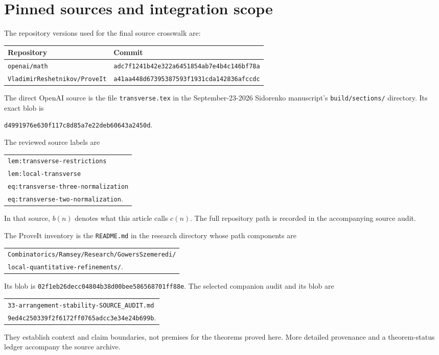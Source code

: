 \documentclass[11pt,a4paper]{article}
\theoremstyle{definition}
\theoremstyle{remark}
\begin{document}
\appendix
\section{Pinned sources and integration scope}
The repository versions used for the final source crosswalk are:
\begin{center}
\begin{tabular}{@{}ll@{}}
\toprule
Repository & Commit\\
\midrule
\texttt{openai/math} & \texttt{adc7f1241b42e322a6451854ab7e4b4c146bf78a}\\
\texttt{VladimirReshetnikov/ProveIt} & \texttt{a41aa448d67395387593f1931cda142836afccdc}\\
\bottomrule
\end{tabular}
\end{center}
The direct OpenAI source is the file \texttt{transverse.tex} in the
September-23-2026 Sidorenko manuscript's \texttt{build/sections/} directory.
Its exact blob is
\begin{center}
\texttt{d4991976e630f117c8d85a7e22deb60643a2450d}.
\end{center}
The reviewed source labels are
\begin{center}
\begin{tabular}{l}
\texttt{lem:transverse-restrictions}\\
\texttt{lem:local-transverse}\\
\texttt{eq:transverse-three-normalization}\\
\texttt{eq:transverse-two-normalization}.
\end{tabular}
\end{center}
In that source, $b(n)$ denotes what this article calls $c(n)$.
The full repository path is recorded in the accompanying source audit.

The ProveIt inventory is the \texttt{README.md} in the research directory
whose path components are
\begin{center}
\begin{tabular}{l}
\texttt{Combinatorics/Ramsey/Research/GowersSzemeredi/}\\
\texttt{local-quantitative-refinements/}.
\end{tabular}
\end{center}
Its blob is \texttt{02f1eb26decc04804b38d00bee586568701ff88e}.
The selected companion audit and its blob are
\begin{center}
\begin{tabular}{l}
\texttt{33-arrangement-stability-SOURCE\_AUDIT.md}\\
\texttt{9ed4c250339f2f6172ff0765adcc3e34e24b699b}.
\end{tabular}
\end{center}
They establish context and claim boundaries, not premises for the theorems
proved here. More detailed provenance and a theorem-status ledger accompany
the source archive.
\end{document}
